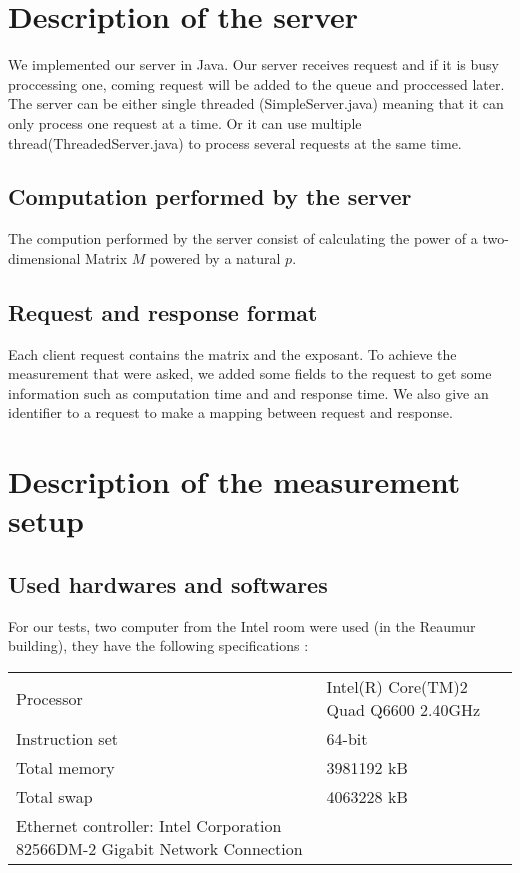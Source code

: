 \section{Description of the server}
\label{sec:Description of the server}

We implemented our server in Java. Our server receives request and if it is busy proccessing one,
coming request will be added to the queue and proccessed later. The server can be either
single threaded (SimpleServer.java) meaning that it can only process one request at a time. Or
it can use multiple thread(ThreadedServer.java) to process several requests at the same time.

\subsection{Computation performed by the server}
\label{sub:Computation performed by the server}
The compution performed by the server consist of calculating the power of a
two-dimensional Matrix $M$ powered by a natural $p$.

\subsection{Request and response format}
\label{sub:Request and response format}

Each client request contains the matrix and the exposant. To achieve the
measurement that were asked, we added some fields to the request to get
some information such as computation time and and response time. We also
give an identifier to a request to make a mapping between request and response.

\section{Description of the measurement setup}
\label{sec:Description of the measurement setup}

\subsection{Used hardwares and softwares}
\label{sub:Used hardwares and softwares}

For our tests, two computer from the Intel room were used (in the Reaumur
building), they have the following specifications :

\begin{tabular}{|l|l|}
    \hline
    Processor & Intel(R) Core(TM)2 Quad Q6600 \@ 2.40GHz \\
    Instruction set & 64-bit \\
    \hline
    Total memory & 3981192 kB \\
    Total swap & 4063228 kB \\
    \hline
    Ethernet controller: Intel Corporation 82566DM-2 Gigabit Network Connection
    \hline
\end{tabular}
\bigskip

